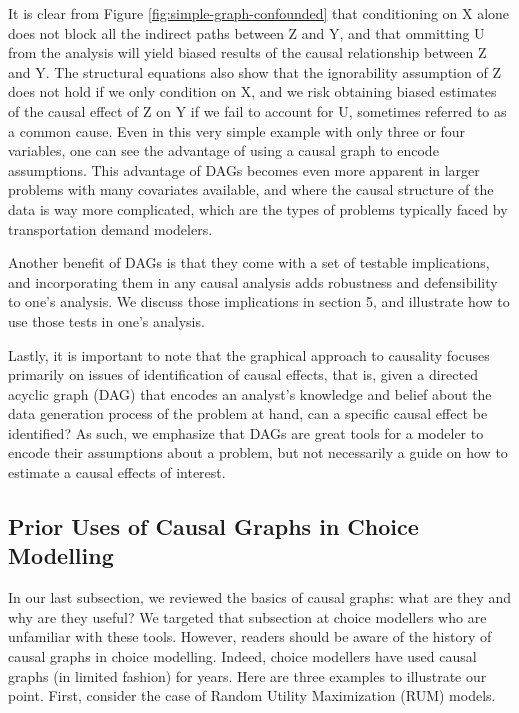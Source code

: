 It is clear from Figure \ref{fig:simple-graph-confounded} that conditioning on X alone does not block all the indirect paths between Z and Y, and that ommitting U from the analysis will yield biased results of the causal relationship between Z and Y.
The structural equations also show that the ignorability assumption
of Z does not hold if we only condition on X, and we risk obtaining biased estimates of the causal effect of Z on Y if we fail to
account for U, sometimes referred to as a common cause.
Even in this very simple example with only three or four variables, one can see the advantage of using a causal graph to encode assumptions.
This advantage of DAGs becomes even more apparent in larger problems with many covariates available, and where the causal structure of the data is way more complicated, which are the types of problems typically faced by transportation demand modelers.

Another benefit of DAGs is that they come with a set of testable implications, and incorporating them in any causal
analysis adds robustness and defensibility to one's analysis.
We discuss those implications in section 5, and illustrate how to use those tests in one's analysis.

Lastly, it is important to note that the graphical approach to causality focuses
primarily on issues of identification of causal effects, that is, given a
directed acyclic graph (DAG) that encodes an analyst's knowledge and belief
about the data generation process of the problem at hand, can a specific
causal effect be identified?
As such, we emphasize that DAGs are great tools
for a modeler to encode their assumptions about a problem, but not necessarily
a guide on how to estimate a causal effects of interest.

\subsection{Prior Uses of Causal Graphs in Choice Modelling}
\label{sec:choice-graphs}

In our last subsection, we reviewed the basics of causal graphs: what are they and why are they useful?
We targeted that subsection at choice modellers who are unfamiliar with these tools.
However, readers should be aware of the history of causal graphs in choice modelling.
Indeed, choice modellers have used causal graphs (in limited fashion) for years.
Here are three examples to illustrate our point.
First, consider the case of Random Utility Maximization (RUM) models.

